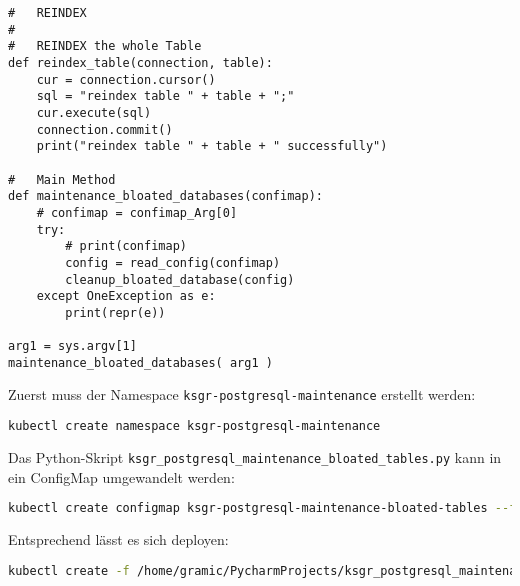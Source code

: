 \begin{flushleft}
\begin{lstlisting}
#   REINDEX
#
#   REINDEX the whole Table
def reindex_table(connection, table):
    cur = connection.cursor()
    sql = "reindex table " + table + ";"
    cur.execute(sql)
    connection.commit()
    print("reindex table " + table + " successfully")

#   Main Method
def maintenance_bloated_databases(confimap):
    # confimap = confimap_Arg[0]
    try:
        # print(confimap)
        config = read_config(confimap)
        cleanup_bloated_database(config)
    except OneException as e:
        print(repr(e))

arg1 = sys.argv[1]
maintenance_bloated_databases( arg1 )
    \end{lstlisting}
\end{flushleft}
\begin{flushleft}
    Zuerst muss der Namespace \texttt{ksgr-postgresql-maintenance} erstellt werden:
    \lstset{style=gra_codestyle}
    \begin{lstlisting}[language=bash, caption=Maintenance-Tool - Bloated Tables / Indices - Namespace,captionpos=b,label={lst:maintenannce-tool-bloated-tables-namespace},breaklines=true]
kubectl create namespace ksgr-postgresql-maintenance
    \end{lstlisting}
\end{flushleft}
\begin{flushleft}
    Das Python-Skript \texttt{ksgr\_postgresql\_maintenance\_bloated\_tables.py} kann in ein ConfigMap umgewandelt werden:
    \lstset{style=gra_codestyle}
    \begin{lstlisting}[language=bash, caption=Maintenance-Tool - Bloated Tables / Indices - Python > ConfigMap,captionpos=b,label={lst:maintenannce-tool-bloated-tables-python-to-configmap},breaklines=true]
kubectl create configmap ksgr-postgresql-maintenance-bloated-tables --from-file /home/gramic/PycharmProjects/ksgr_postgresql_maintenance/cleaned/ksgr_postgresql_maintenance_bloated_tables.py --dry-run=client -o yaml > /home/gramic/PycharmProjects/ksgr_postgresql_maintenance/cleaned/ksgr_postgresql_maintenance_bloated_tables.yml -n ksgr-postgresql-maintenance
    \end{lstlisting}
    Entsprechend lässt es sich deployen:
    \lstset{style=gra_codestyle}
    \begin{lstlisting}[language=bash, caption=Maintenance-Tool - Bloated Tables / Indices - Python - ConfigMap Deploy,captionpos=b,label={lst:maintenannce-tool-bloated-tables-python-configmap-deploy},breaklines=true]
kubectl create -f /home/gramic/PycharmProjects/ksgr_postgresql_maintenance/cleaned/ksgr_postgresql_maintenance_bloated_tables.yml -n ksgr-postgresql-maintenance
    \end{lstlisting}
\end{flushleft}
